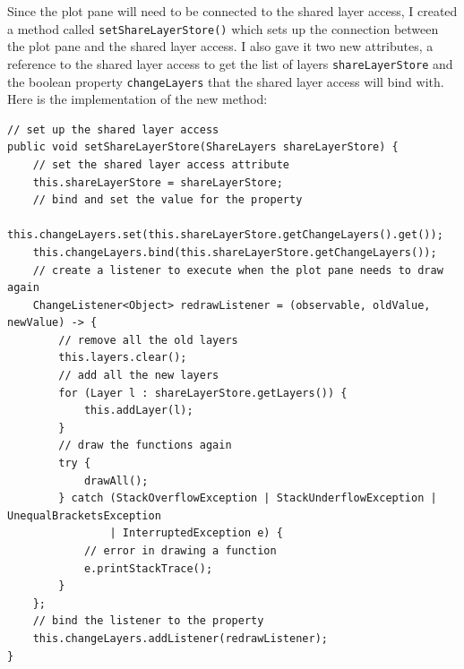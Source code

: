 \documentclass[../../../../main.tex]{subfiles}
\begin{document}
\newpage\noindent
Since the plot pane will need to be connected to the shared layer access, I created a method called \texttt{setShareLayerStore()} which sets up the connection between the plot pane and the shared layer access. I also gave it two new attributes, a reference to the shared layer access to get the list of layers \texttt{shareLayerStore} and the boolean property \texttt{changeLayers} that the shared layer access will bind with. Here is the implementation of the new method:
\begin{verbatim}
// set up the shared layer access
public void setShareLayerStore(ShareLayers shareLayerStore) {
	// set the shared layer access attribute
	this.shareLayerStore = shareLayerStore;
	// bind and set the value for the property
	this.changeLayers.set(this.shareLayerStore.getChangeLayers().get());
	this.changeLayers.bind(this.shareLayerStore.getChangeLayers());
	// create a listener to execute when the plot pane needs to draw again
	ChangeListener<Object> redrawListener = (observable, oldValue, newValue) -> {
		// remove all the old layers
		this.layers.clear();
		// add all the new layers
		for (Layer l : shareLayerStore.getLayers()) {
			this.addLayer(l);
		}
		// draw the functions again
		try {
			drawAll();
		} catch (StackOverflowException | StackUnderflowException | UnequalBracketsException
				| InterruptedException e) {
			// error in drawing a function
			e.printStackTrace();
		}
	};
	// bind the listener to the property
	this.changeLayers.addListener(redrawListener);
}
\end{verbatim}
\newpage
\end{document}
